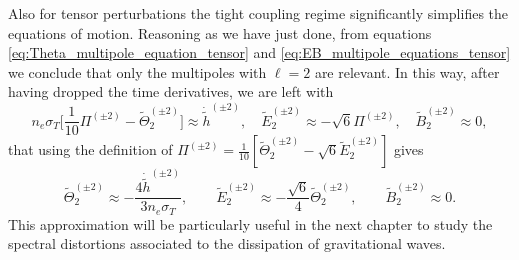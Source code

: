Also for tensor perturbations the tight coupling regime significantly simplifies the equations of motion. Reasoning as we have just done, from equations \eqref{eq:Theta_multipole_equation_tensor} and \eqref{eq:EB_multipole_equations_tensor} we conclude that only the multipoles with $\ell=2$ are relevant. In this way, after having dropped the time derivatives, we are left with 
$$n_e\sigma_T\bigg[\frac{1}{10}\Pi^{(\pm2)}-\tilde\Theta_2^{(\pm2)}\bigg]\approx\dot{\tilde h}^{(\pm2)},\quad\tilde E_2^{(\pm2)}\approx-\sqrt{6}\Pi^{(\pm2)},\quad\tilde B_{2}^{(\pm2)}\approx0,$$
that using the definition of $\Pi^{(\pm2)}=\frac{1}{10}[\tilde\Theta_{2}^{(\pm2)}-\sqrt 6 \tilde E_{2}^{(\pm2)}]$ gives
\begin{equation}
    \label{eq:TightCouplingTensor}
    \tilde\Theta_2^{(\pm2)}\approx-\frac{4\dot{\tilde h}^{(\pm2)}}{3n_e\sigma_T},\qquad\tilde E_2^{(\pm2)}\approx-\frac{\sqrt{6}}{4}\tilde\Theta_2^{(\pm2)},\qquad\tilde B_{2}^{(\pm2)}\approx0.
\end{equation}
This approximation will be particularly useful in the next chapter to study the spectral distortions associated to the dissipation of gravitational waves.
